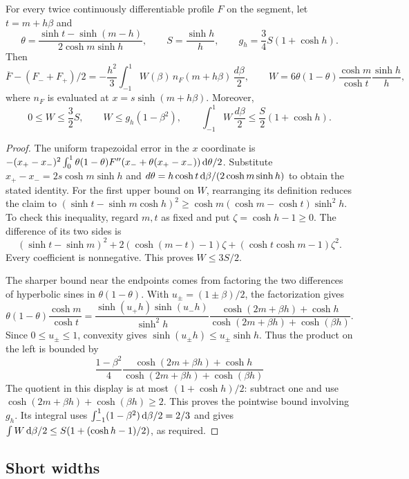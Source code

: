 \begin{lemma}\label{lem:segment-chord}
For every twice continuously differentiable profile $F$ on the segment, let $t=m+h\beta$ and
\[
 \theta=\frac{\sinh t-\sinh(m-h)}{2\cosh m\sinh h},\qquad
 S=\frac{\sinh h}{h},\qquad g_h=\frac34S(1+\cosh h).
\]
Then
\[
 \overline F-(F_-+F_+)/2 =-\frac{h^2}{3}\int_{-1}^1 W(\beta)\,n_F(m+h\beta)\,\frac{d\beta}2,\qquad
 W=6\theta(1-\theta)\frac{\cosh m}{\cosh t}\frac{\sinh h}{h},
\]
where $n_F$ is evaluated at $x=s\sinh(m+h\beta)$. Moreover,
\[
 0\le W\le\frac32S,\qquad
 W\le g_h(1-\beta^2),\qquad
 \int_{-1}^1W\,\frac{d\beta}{2}\le\frac S2(1+\cosh h).
\]
\end{lemma}
\begin{proof}
The uniform trapezoidal error in the $x$ coordinate is $-(x_+-x_-)^2\int_0^1\theta(1-\theta)F''(x_-+\theta(x_+-x_-))\,\mathrm{d} \theta/2$. Substitute $x_+-x_-=2s\cosh m\sinh h$ and $d\theta=h\cosh t\,\mathrm{d} \beta/(2\cosh m\sinh h)$ to obtain the stated identity. For the first upper bound on $W$, rearranging its definition reduces the claim to $(\sinh t-\sinh m\cosh h)^2\ge \cosh m(\cosh m-\cosh t)\sinh^2h$. To check this inequality, regard $m,t$ as fixed and put $\zeta=\cosh h-1\ge0$. The difference of its two sides is
\[
 (\sinh t-\sinh m)^2
 +2(\cosh(m-t)-1)\zeta
 +(\cosh t\cosh m-1)\zeta^2.
\]
Every coefficient is nonnegative. This proves $W\le3S/2$.

The sharper bound near the endpoints comes from factoring the two differences of hyperbolic sines in $\theta(1-\theta)$. With $u_\pm=(1\pm\beta)/2$, the factorization gives
\[
 \theta(1-\theta)\frac{\cosh m}{\cosh t}
 =\frac{\sinh(u_+h)\sinh(u_-h)}{\sinh^2h}
  \frac{\cosh(2m+\beta h)+\cosh h}
       {\cosh(2m+\beta h)+\cosh(\beta h)}.
\]
Since $0\le u_\pm\le1$, convexity gives $\sinh(u_\pm h)\le u_\pm\sinh h$. Thus the product on the left is bounded by
\[
 \frac{1-\beta^2}{4}\frac{\cosh(2m+\beta h)+\cosh h}{\cosh(2m+\beta h)+\cosh(\beta h)}
\]
The quotient in this display is at most $(1+\cosh h)/2$: subtract one and use $\cosh(2m+\beta h)+\cosh(\beta h)\ge2$. This proves the pointwise bound involving $g_h$. Its integral uses $\int_{-1}^1(1-\beta^2)\,\mathrm{d} \beta/2=2/3$ and gives $\int W\,\mathrm{d} \beta/2\le S(1+(\cosh h-1)/2)$, as required.
\end{proof}

\subsection{Short widths}\label{subsec:segments-short}

